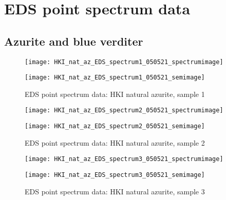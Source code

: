 \chapter{EDS point spectrum data} 

\section{Azurite and blue verditer}

\begin{figure}[H]
\centering
\begin{minipage}{.45\textwidth}
  \centering
  \texttt{[image: HKI\_nat\_az\_EDS\_spectrum1\_050521\_spectrumimage]}
\end{minipage}
\begin{minipage}{.45\textwidth}
  \centering
  \texttt{[image: HKI\_nat\_az\_EDS\_spectrum1\_050521\_semimage]}
\end{minipage}
\caption[EDS point spectrum data: HKI natural azurite, sample 1]{EDS point spectrum data: HKI natural azurite, sample 1}
\label{fig:hki_point_eds_1}
\end{figure}

\begin{figure}[H]
\centering
\begin{minipage}{.45\textwidth}
  \centering
  \texttt{[image: HKI\_nat\_az\_EDS\_spectrum2\_050521\_spectrumimage]}
\end{minipage}
\begin{minipage}{.45\textwidth}
  \centering
  \texttt{[image: HKI\_nat\_az\_EDS\_spectrum2\_050521\_semimage]}
\end{minipage}
\caption[EDS point spectrum data: HKI natural azurite, sample 2]{EDS point spectrum data: HKI natural azurite, sample 2}
\label{fig:hki_point_eds_2}
\end{figure}

\begin{figure}[H]
\centering
\begin{minipage}{.45\textwidth}
  \centering
  \texttt{[image: HKI\_nat\_az\_EDS\_spectrum3\_050521\_spectrumimage]}
\end{minipage}
\begin{minipage}{.45\textwidth}
  \centering
  \texttt{[image: HKI\_nat\_az\_EDS\_spectrum3\_050521\_semimage]}
\end{minipage}
\caption[EDS point spectrum data: HKI natural azurite, sample 3]{EDS point spectrum data: HKI natural azurite, sample 3}
\label{fig:hki_point_eds_3}
\end{figure}

